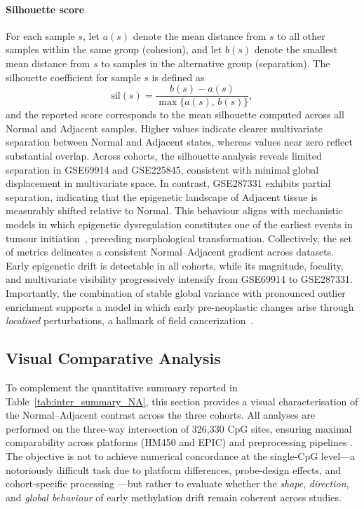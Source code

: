 \paragraph{Silhouette score}  

For each sample $s$, let $a(s)$ denote the mean distance from $s$ to all other samples within the same group (cohesion), and let $b(s)$ denote the smallest mean distance from $s$ to samples in the alternative group (separation).  
The silhouette coefficient for sample $s$ is defined as
\begin{equation}
\mathrm{sil}(s) =
\frac{b(s) - a(s)}{\max\{a(s),\, b(s)\}},
\label{eq:silhouette}
\end{equation}
and the reported score corresponds to the mean silhouette computed across all Normal and Adjacent samples.
Higher values indicate clearer multivariate separation between Normal and Adjacent states, whereas values near zero reflect substantial overlap. Across cohorts, the silhouette analysis reveals limited separation in GSE69914 and GSE225845, consistent with minimal global displacement in multivariate space. In contrast, GSE287331 exhibits partial separation, indicating that the epigenetic landscape of Adjacent tissue is measurably shifted relative to Normal. This behaviour aligns with mechanistic models in which epigenetic dysregulation constitutes one of the earliest events in tumour initiation~\cite{Zhang2024_TumorInitiationEpigenetic}, preceding morphological transformation.
Collectively, the set of metrics delineates a consistent Normal--Adjacent gradient across datasets. Early epigenetic drift is detectable in all cohorts, while its magnitude, focality, and multivariate visibility progressively intensify from GSE69914 to GSE287331. Importantly, the combination of stable global variance with pronounced outlier enrichment supports a model in which early pre-neoplastic changes arise through \emph{localised} perturbations, a hallmark of field cancerization~\cite{Teschendorff2016, Yates2024_NormalMucosaField}.

\subsection{Visual Comparative Analysis}
\label{subsec:inter_visual}

To complement the quantitative summary reported in 
Table~\ref{tab:inter_summary_NA}, this section provides a visual 
characterisation of the Normal--Adjacent contrast across the three 
cohorts. All analyses are performed on the three-way intersection of 
326{,}330 CpG sites, ensuring maximal comparability across platforms 
(HM450 and EPIC) and preprocessing pipelines \cite{zhou2017}. The objective is not to achieve numerical concordance at the single-CpG 
level---a notoriously difficult task due to platform differences, 
probe-design effects, and cohort-specific processing 
\cite{pidsley2016, Fortin2014_funnorm}---but rather to evaluate 
whether the \emph{shape}, \emph{direction}, and \emph{global behaviour} 
of early methylation drift remain coherent across studies.

